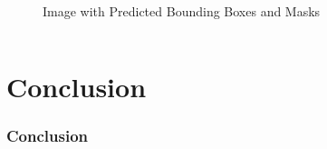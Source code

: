\documentclass{beamer}
\begin{document}
\begin{frame}[t]
\begin{columns}
\begin{column}{0.5\textwidth}
\begin{figure}
        \caption{Image with Predicted Bounding Boxes and Masks}
        \label{fig:post-pre-process}
      \end{figure}
    \end{column}
  \end{columns}
\end{frame}


\section{Conclusion}
\begin{frame}
  \frametitle{Conclusion}
\end{frame}
\end{document}
